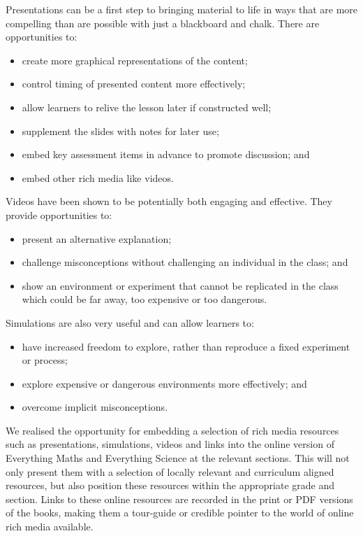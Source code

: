 Presentations can be a first step to bringing material to life in ways that are more compelling than are possible with just a blackboard and chalk. There are opportunities to:
\begin{itemize}[noitemsep]
\item create more graphical representations of the content;
\item control timing of presented content more effectively;
\item allow learners to relive the lesson later if constructed well;
 \item supplement the slides with notes for later use;
\item embed key assessment items in advance to promote discussion; and
\item embed other rich media like videos.
\end{itemize}
Videos have been shown to be potentially both engaging and effective. They provide opportunities to:
\begin{itemize}[noitemsep]
\item present an alternative explanation;
\item challenge misconceptions without challenging an individual in the class; and
\item show an environment or experiment that cannot be replicated in the class which could be far away, too expensive or too dangerous.
\end{itemize}
Simulations are also very useful and can allow learners to:
\begin{itemize}[noitemsep]
\item have increased freedom to explore, rather than reproduce a fixed experiment or process;
\item explore expensive or dangerous environments more effectively; and
\item overcome implicit misconceptions.
\end{itemize}
We realised the opportunity for embedding a selection of rich media resources such as presentations, simulations, videos and links into the online version of Everything Maths and Everything Science at the relevant sections. This will not only present them with a selection of locally relevant and curriculum aligned resources, but also position these resources within the appropriate grade and section. Links to these online resources are recorded in the print or PDF versions of the  books, making them a tour-guide or credible pointer to the world of online rich media available. \par
